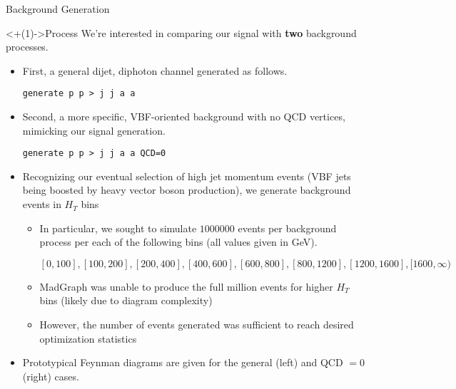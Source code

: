 \documentclass[handout]{beamer}
\begin{document}
\begin{frame}{Background Generation}
    \begin{block}<+(1)->{Process}
        We're interested in comparing our signal with \textbf{two} background processes. 
        \begin{itemize}[<+(1)->]
            \item First, a general dijet, diphoton channel generated as follows.
            
            \smallskip
            
            \texttt{generate p p > j j a a}
            \item Second, a more specific, VBF-oriented background with no QCD vertices, mimicking our signal generation.
            
            \smallskip
            
            \texttt{generate p p > j j a a QCD=0}
            \item Recognizing our eventual selection of high jet momentum events (VBF jets being boosted by heavy vector boson production), we generate background events in $H_T$ bins
            \begin{itemize}[<+(1)->]
                \item In particular, we sought to simulate $1000000$ events per background process per each of the following bins (all values given in GeV).
            
                \smallskip
            
                $[0,100], [100,200], [200,400], [400,600], [600,800], [800,1200], [1200,1600], [1600,\infty)$
                \item MadGraph was unable to produce the full million events for higher $H_T$ bins (likely due to diagram complexity)
                \item However, the number of events generated was sufficient to reach desired optimization statistics
            \end{itemize}
            \item Prototypical Feynman diagrams are given for the general (left) and QCD $= 0$ (right) cases.
        \end{itemize}
    \end{block}
    

\end{frame}
\end{document}
